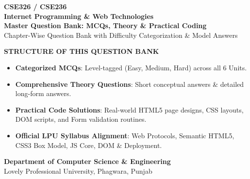 \begin{titlepage}
\begin{center}
\vspace*{10mm}
{\Huge\sffamily\bfseries\color{CSNavy} CSE326 / CSE236}\\[3mm]
{\LARGE\sffamily\bfseries\color{CSCyan} Internet Programming \& Web Technologies}\\[6mm]
{\Large\sffamily\bfseries Master Question Bank: MCQs, Theory \& Practical Coding}\\[4mm]
{\large\color{DarkSlate} Chapter-Wise Question Bank with Difficulty Categorization \& Model Answers}\\[15mm]

\begin{tcolorbox}[enhanced,colback=LightBg,colframe=CSNavy,arc=3mm,width=0.9\textwidth,boxrule=1.5pt]
\centering\vspace{2mm}
{\large\sffamily\bfseries\color{CSNavy} STRUCTURE OF THIS QUESTION BANK}\\[3mm]
\begin{itemize}[leftmargin=8mm,itemsep=1.5mm]
  \item \textbf{Categorized MCQs}: Level-tagged (Easy, Medium, Hard) across all 6 Units.
  \item \textbf{Comprehensive Theory Questions}: Short conceptual answers \& detailed long-form answers.
  \item \textbf{Practical Code Solutions}: Real-world HTML5 page designs, CSS layouts, DOM scripts, and Form validation routines.
  \item \textbf{Official LPU Syllabus Alignment}: Web Protocols, Semantic HTML5, CSS3 Box Model, JS Core, DOM \& Deployment.
\end{itemize}
\vspace{2mm}
\end{tcolorbox}

\vfill
{\large\sffamily\bfseries Department of Computer Science \& Engineering}\\
{\large Lovely Professional University, Phagwara, Punjab}
\end{center}
\end{titlepage}
